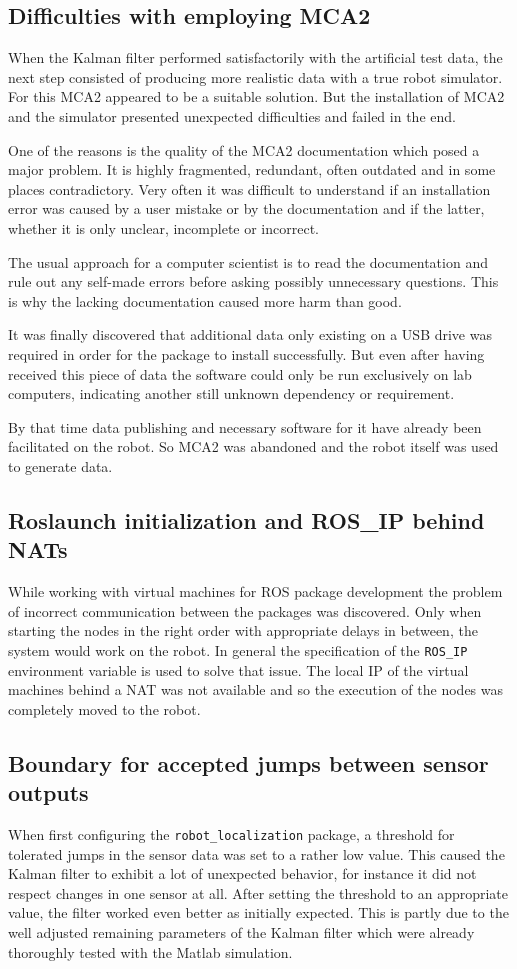 \subsection{Difficulties with employing MCA2}
When the Kalman filter performed satisfactorily with the artificial test data, the next step consisted of producing more realistic data with a true robot simulator. For this MCA2 appeared to be a suitable solution. But the installation of MCA2 and the simulator presented unexpected difficulties and failed in the end.

One of the reasons is the quality of the MCA2 documentation which posed a major problem. It is highly fragmented, redundant, often outdated and in some places contradictory. Very often it was difficult to understand if an installation error was caused by a user mistake or by the documentation and if the latter, whether it is only unclear, incomplete or incorrect. 

The usual approach for a computer scientist is to read the documentation and rule out any self-made errors before asking possibly unnecessary questions. This is why the lacking documentation caused more harm than good.

It was finally discovered that additional data only existing on a USB drive was required in order for the package to install successfully. But even after having received this piece of data the software could only be run exclusively on lab computers, indicating another still unknown dependency or requirement.

By that time data publishing and necessary software for it have already been facilitated on the robot. So MCA2 was abandoned and the robot itself was used to generate data.

\subsection{Roslaunch initialization and ROS\_IP behind NATs}
While working with virtual machines for ROS package development the problem of incorrect communication between the packages was discovered. Only when starting the nodes in the right order with appropriate delays in between, the system would work on the robot. In general the specification of the \texttt{ROS\_IP} environment variable is used to solve that issue. The local IP of the virtual machines behind a NAT was not available and so the execution of the nodes was completely moved to the robot.

\subsection{Boundary for accepted jumps between sensor outputs}
When first configuring the \texttt{robot\_localization} package, a threshold for tolerated jumps in the sensor data was set to a rather low value. This caused the Kalman filter to exhibit a lot of unexpected behavior, for instance it did not respect changes in one sensor at all. After setting the threshold to an appropriate value, the filter worked even better as initially expected. This is partly due to the well adjusted remaining parameters of the Kalman filter which were already thoroughly tested with the Matlab simulation.

